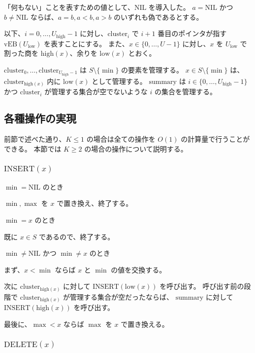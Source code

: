 \documentclass[dvipdfmx,a4j,10pt]{jarticle}
\begin{document}
「何もない」ことを表すための値として、$\mathrm{NIL}$ を導入した。
$a = \mathrm{NIL}$ かつ $b \neq \mathrm{NIL}$ ならば、$a = b, a < b, a > b$ のいずれも偽であるとする。

以下、$i = 0, \dots, U_{\mathrm{high}} - 1$ に対し、$\mathrm{cluster}_i$ で $i + 1$ 番目のポインタが指す $\mathrm{vEB}(U_{\mathrm{low}})$ を表すことにする。
また、$x \in \{0, \dots, U - 1\}$ に対し、$x$ を $U_{\mathrm{low}}$ で割った商を $\mathrm{high}(x)$、余りを $\mathrm{low}(x)$ とおく。

$\mathrm{cluster}_0, \dots, \mathrm{cluster}_{U_{\mathrm{high}} - 1}$ は $S \setminus \{\min\}$ の要素を管理する。
$x \in S \setminus \{\min\}$ は、$\mathrm{cluster}_{\mathrm{high}(x)}$ 内に $\mathrm{low}(x)$ として管理する。
$\mathrm{summary}$ は $i \in \{0, \dots, U_{\mathrm{high}} - 1\}$ かつ $\mathrm{cluster}_i$ が管理する集合が空でないような $i$ の集合を管理する。

\subsection{各種操作の実現}

前節で述べた通り、$K \leq 1$ の場合は全ての操作を $O(1)$ の計算量で行うことができる。
本節では $K \geq 2$ の場合の操作について説明する。

\subsubsection{$\mathrm{INSERT}(x)$}

\noindent [1] $\min = \mathrm{NIL}$ のとき

$\min, \max$ を $x$ で置き換え、終了する。

\noindent [2] $\min = x$ のとき

既に $x \in S$ であるので、終了する。

\noindent [3] $\min \neq \mathrm{NIL}$ かつ $\min \neq x$ のとき

まず、$x < \min$ ならば $x$ と $\min$ の値を交換する。

次に $\mathrm{cluster}_{\mathrm{high}(x)}$ に対して $\mathrm{INSERT}(\mathrm{low}(x))$ を呼び出す。
呼び出す前の段階で $\mathrm{cluster}_{\mathrm{high}(x)}$ が管理する集合が空だったならば、
$\mathrm{summary}$ に対して $\mathrm{INSERT}(\mathrm{high}(x))$ を呼び出す。

最後に、$\max < x$ ならば $\max$ を $x$ で置き換える。

\subsubsection{$\mathrm{DELETE}(x)$}
\end{document}
